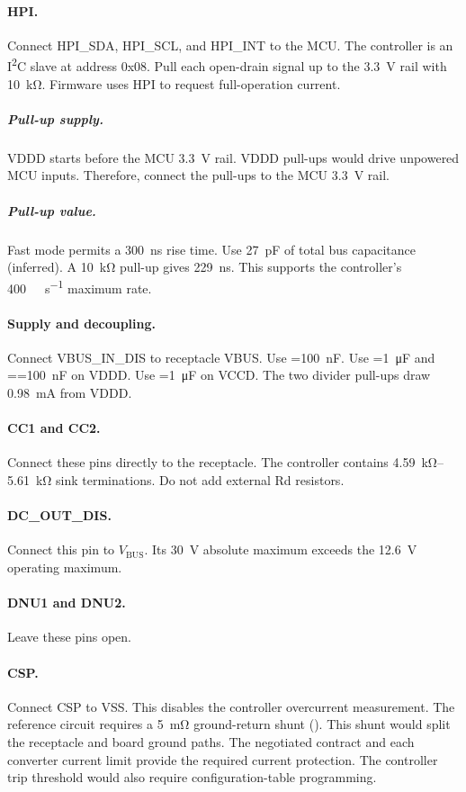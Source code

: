 \paragraph{HPI.} Connect HPI\_SDA, HPI\_SCL, and HPI\_INT to the MCU. The
controller is an I\textsuperscript{2}C slave at address 0x08. Pull each
open-drain signal up to the 3.3~V rail with \SI{10}{\kilo\ohm}. Firmware uses
HPI to request full-operation current.

\subparagraph{Pull-up supply.} VDDD starts before the MCU 3.3~V rail. VDDD
pull-ups would drive unpowered MCU inputs. Therefore, connect the pull-ups to
the MCU 3.3~V rail.

\subparagraph{Pull-up value.} Fast mode permits a \SI{300}{\nano\second} rise
time. Use \SI{27}{\pico\farad} of total bus capacitance (inferred). A
\SI{10}{\kilo\ohm} pull-up gives \SI{229}{\nano\second}. This supports the
controller's \SI{400}{\kilo\bit\per\second} maximum rate.

\paragraph{Supply and decoupling.} Connect VBUS\_IN\_DIS to receptacle VBUS.
Use =\SI{100}{\nano\farad}. Use
=\SI{1}{\micro\farad} and
==\SI{100}{\nano\farad} on VDDD. Use
=\SI{1}{\micro\farad} on VCCD. The two divider pull-ups draw
\SI{0.98}{\milli\ampere} from VDDD.

\paragraph{CC1 and CC2.} Connect these pins directly to the receptacle. The
controller contains \SIrange{4.59}{5.61}{\kilo\ohm} sink terminations. Do not
add external Rd resistors.

\paragraph{DC\_OUT\_DIS.} Connect this pin to $V_{\mathrm{BUS}}$. Its
\SI{30}{\volt} absolute maximum exceeds the \SI{12.6}{\volt} operating maximum.

\paragraph{DNU1 and DNU2.} Leave these pins open.

\paragraph{CSP.} Connect CSP to VSS. This disables the controller overcurrent
measurement. The reference circuit requires a \SI{5}{\milli\ohm} ground-return
shunt (). This shunt would
split the receptacle and board ground paths. The negotiated contract and each
converter current limit provide the required current protection. The controller
trip threshold would also require configuration-table programming.

